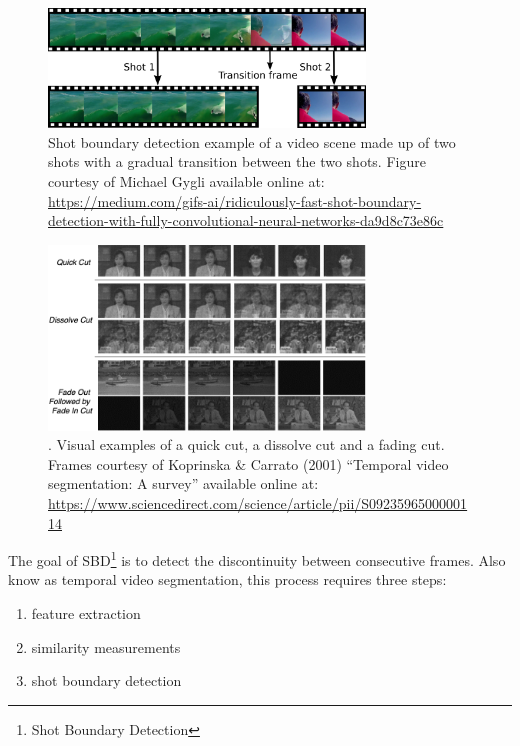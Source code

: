 \begin{figure}[h] 
\centerline{\includegraphics[width=0.75\textwidth]{figures/litsurvey/shot_boundary_detection.png}}
\caption{\label{fig:shot_boundary_detection}Shot boundary detection example of a video scene made up of two shots with a gradual transition between the two shots. Figure courtesy of Michael Gygli available online at: \url{https://medium.com/gifs-ai/ridiculously-fast-shot-boundary-detection-with-fully-convolutional-neural-networks-da9d8c73e86c}}
\end{figure}

\begin{figure}[h] 
\centerline{\includegraphics[width=0.75\textwidth]{figures/litsurvey/video_transitions.png}}
\caption{\label{fig:video_transitions}. Visual examples of a quick cut, a dissolve cut and a fading cut. Frames courtesy of Koprinska \& Carrato (2001) ``Temporal video segmentation: A survey'' available online at: \url{https://www.sciencedirect.com/science/article/pii/S0923596500000114}}
\end{figure}

The goal of SBD\footnote{Shot Boundary Detection} is to detect the discontinuity between consecutive frames. Also know as temporal video segmentation, this process requires three steps:
\begin{enumerate}
    \item feature extraction
    \item similarity measurements
    \item shot boundary detection
\end{enumerate}


